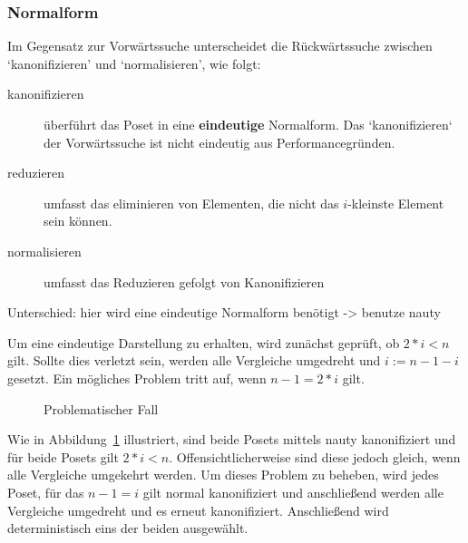 \documentclass[10pt,journal,compsoc]{IEEEtran}
\begin{document}
\subsubsection{Normalform}
Im Gegensatz zur Vorwärtssuche unterscheidet die Rückwärtssuche zwischen `kanonifizieren' und `normalisieren', wie folgt:
\begin{description}
  \item[kanonifizieren]
    überführt das Poset in eine \textbf{eindeutige} Normalform.
    Das `kanonifizieren` der Vorwärtssuche ist nicht eindeutig aus Performancegründen.
  \item[reduzieren]
    umfasst das eliminieren von Elementen, die nicht das $i$-kleinste Element sein können.
  \item[normalisieren]
    umfasst das Reduzieren gefolgt von Kanonifizieren
\end{description}

Unterschied: hier wird eine eindeutige Normalform benötigt
-> benutze nauty

Um eine eindeutige Darstellung zu erhalten, wird zunächst geprüft, ob $2 * i < n$ gilt.
Sollte dies verletzt sein, werden alle Vergleiche umgedreht und $i := n - 1 - i$ gesetzt.
Ein mögliches Problem tritt auf, wenn $n - 1 = 2 * i$ gilt.
\begin{figure}
  \centering
  \caption{Problematischer Fall}
  \label{fig:backward_canonify_problematic}
\end{figure}
Wie in Abbildung~\ref{fig:backward_canonify_problematic} illustriert, sind beide Posets mittels nauty kanonifiziert und für beide Posets gilt  $2 * i < n$.
Offensichtlicherweise sind diese jedoch gleich, wenn alle Vergleiche umgekehrt werden.
Um dieses Problem zu beheben, wird jedes Poset, für das $n - 1 = i$ gilt normal kanonifiziert und anschließend werden alle Vergleiche umgedreht und es erneut kanonifiziert.
Anschließend wird deterministisch eins der beiden ausgewählt.
\end{document}
